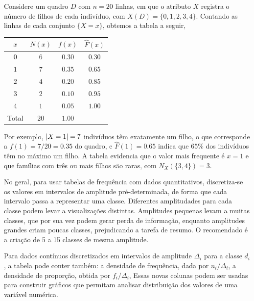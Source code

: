 \begin{exp:tabela de frequencia}
Considere um quadro $D$ com $n = 20$ linhas, em que o atributo $X$ registra o número de
filhos de cada indivíduo, com $X(D) = \{0, 1, 2, 3, 4\}$.
Contando as linhas de cada conjunto $\{X = x\}$, obtemos a tabela a seguir,
\begin{center}
\begin{tabular}{cccc}
\toprule
$x$ & $N(x)$ & $f(x)$ & $\hat F(x)$ \\
\midrule
$0$ & $6$ & $0.30$ & $0.30$ \\
$1$ & $7$ & $0.35$ & $0.65$ \\
$2$ & $4$ & $0.20$ & $0.85$ \\
$3$ & $2$ & $0.10$ & $0.95$ \\
$4$ & $1$ & $0.05$ & $1.00$ \\
\midrule
Total & $20$ & $1.00$ & \\
\bottomrule
\end{tabular}
\end{center}
Por exemplo, $\lvert X = 1 \rvert = 7$ indivíduos têm exatamente um filho, o que corresponde a
$f(1) = 7/20 = 0.35$ do quadro, e $\hat F(1) = 0.65$ indica que $65\%$ dos indivíduos
têm no máximo um filho.
A tabela evidencia que o valor mais frequente é $x = 1$ e que famílias com três ou mais
filhos são raras, com $N_X(\{3, 4\}) = 3$.
\end{exp:tabela de frequencia}

No geral, para usar tabelas de frequência com dados quantitativos, discretiza-se os
valores em intervalos de amplitude pré-determinada, de forma que cada intervalo passa a
representar uma classe.
Diferentes amplitudades para cada classe podem levar a visualizações distintas.
Amplitudes pequenas levam a muitas classes, que por sua vez podem gerar perda de informação,
enquanto amplitudes grandes criam poucas classes, prejudicando a tarefa de resumo.
O recomendado é a criação de 5 a 15 classes de mesma amplitude.

Para dados contínuos discretizados em intervalos de amplitude $\Delta_i$ para a classe
$d_i$, a tabela pode conter também: a densidade de frequência, dada por $n_i / \Delta_i$,
a densidade de proporção, obtida por $f_i / \Delta_i$,
Essas novas colunas podem ser usadas para construir gráficos que permitam analisar
distribuição dos valores de uma variável numérica.

